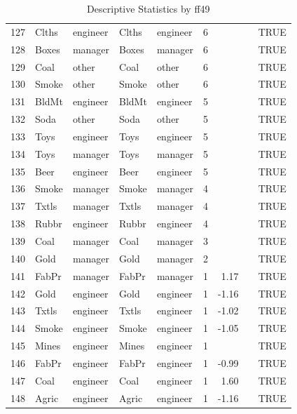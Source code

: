 \begin{table}[ht]
\begin{tabular}{rllllrrrl}
  127 & Clths & engineer & Clths & engineer &   6 &  &  & TRUE \\ 
  128 & Boxes & manager & Boxes & manager &   6 &  &  & TRUE \\ 
  129 & Coal & other & Coal & other &   6 &  &  & TRUE \\ 
  130 & Smoke & other & Smoke & other &   6 &  &  & TRUE \\ 
  131 & BldMt & engineer & BldMt & engineer &   5 &  &  & TRUE \\ 
  132 & Soda & other & Soda & other &   5 &  &  & TRUE \\ 
  133 & Toys & engineer & Toys & engineer &   5 &  &  & TRUE \\ 
  134 & Toys & manager & Toys & manager &   5 &  &  & TRUE \\ 
  135 & Beer & engineer & Beer & engineer &   5 &  &  & TRUE \\ 
  136 & Smoke & manager & Smoke & manager &   4 &  &  & TRUE \\ 
  137 & Txtls & manager & Txtls & manager &   4 &  &  & TRUE \\ 
  138 & Rubbr & engineer & Rubbr & engineer &   4 &  &  & TRUE \\ 
  139 & Coal & manager & Coal & manager &   3 &  &  & TRUE \\ 
  140 & Gold & manager & Gold & manager &   2 &  &  & TRUE \\ 
  141 & FabPr & manager & FabPr & manager &   1 & 1.17 &  & TRUE \\ 
  142 & Gold & engineer & Gold & engineer &   1 & -1.16 &  & TRUE \\ 
  143 & Txtls & engineer & Txtls & engineer &   1 & -1.02 &  & TRUE \\ 
  144 & Smoke & engineer & Smoke & engineer &   1 & -1.05 &  & TRUE \\ 
  145 & Mines & engineer & Mines & engineer &   1 &  &  & TRUE \\ 
  146 & FabPr & engineer & FabPr & engineer &   1 & -0.99 &  & TRUE \\ 
  147 & Coal & engineer & Coal & engineer &   1 & 1.60 &  & TRUE \\ 
  148 & Agric & engineer & Agric & engineer &   1 & -1.16 &  & TRUE \\ 
   \hline
\end{tabular}
\caption{Descriptive Statistics by ff49} 
\end{table}
